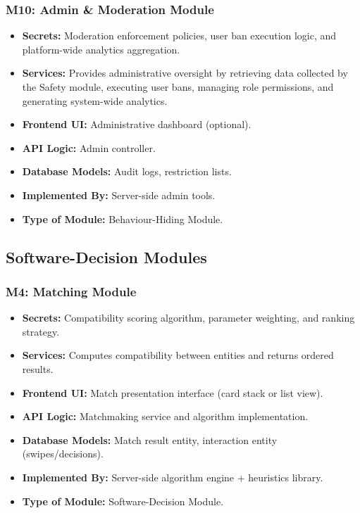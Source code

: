 \subsubsection*{M10: Admin \& Moderation Module}
\begin{itemize}
  \item \textbf{Secrets:} Moderation enforcement policies, user ban execution logic, and platform-wide analytics aggregation.
  \item \textbf{Services:} Provides administrative oversight by retrieving data collected by the Safety module, executing user bans, managing role permissions, and generating system-wide analytics.
  \item \textbf{Frontend UI:} Administrative dashboard (optional).
  \item \textbf{API Logic:} Admin controller.
  \item \textbf{Database Models:} Audit logs, restriction lists.
  \item \textbf{Implemented By:} Server-side admin tools.
  \item \textbf{Type of Module:} Behaviour-Hiding Module.
\end{itemize}

\subsection*{Software-Decision Modules}

\subsubsection*{M4: Matching Module}
\begin{itemize}
  \item \textbf{Secrets:} Compatibility scoring algorithm, parameter weighting, and ranking strategy.
  \item \textbf{Services:} Computes compatibility between entities and returns ordered results.
  \item \textbf{Frontend UI:} Match presentation interface (card stack or list view).
  \item \textbf{API Logic:} Matchmaking service and algorithm implementation.
  \item \textbf{Database Models:} Match result entity, interaction entity (swipes/decisions).
  \item \textbf{Implemented By:} Server-side algorithm engine + heuristics library.
  \item \textbf{Type of Module:} Software-Decision Module.
\end{itemize}

